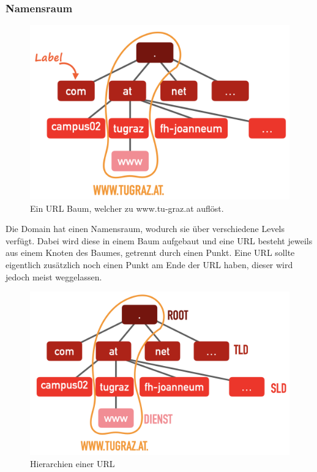 \documentclass{article}
\begin{document}
	 \subsubsection{Namensraum}
	 \begin{figure}[H]
	 \centering
	 \includegraphics[scale=0.3]{Bilder/URL.png}
	 \caption{Ein URL Baum, welcher zu www.tu-graz.at auflöst.}
	 \end{figure}
	 Die Domain hat einen Namensraum, wodurch sie über verschiedene Levels verfügt. Dabei wird diese in einem Baum aufgebaut und eine URL besteht jeweils aus einem Knoten des Baumes, getrennt durch einen Punkt. Eine URL sollte eigentlich zusätzlich noch einen Punkt am Ende der URL haben, dieser wird jedoch meist weggelassen. \\
	 \begin{figure}[H]
	 \centering
	 \includegraphics[scale=0.3]{Bilder/DNS.png}
	 \caption{Hierarchien einer URL}
	 \end{figure}
\end{document}
